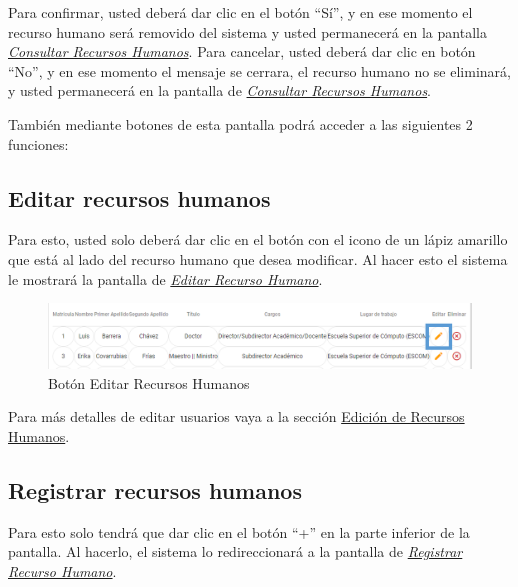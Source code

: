 \begin{enumerate}
\begin{figure}[!hbtp]
                \end{figure}
            
                Para confirmar, usted deberá dar clic en el botón “Sí”, y en ese momento el recurso humano será removido del sistema y usted permanecerá en la pantalla \hyperlink{consultarRH}{\textit{Consultar Recursos Humanos}}.
                Para cancelar, usted deberá dar clic en botón “No”, y en ese momento el mensaje se cerrara, el recurso humano no se eliminará, y usted permanecerá en la pantalla de \hyperlink{consultarRH}{\textit{Consultar Recursos Humanos}}.

                
        
        \end{enumerate}

        También mediante botones de esta pantalla podrá acceder a las siguientes 2 funciones:

        \subsection{Editar recursos humanos}

            Para esto, usted solo deberá dar clic en el botón con el icono de un lápiz amarillo que está al lado del recurso humano que desea modificar. Al hacer esto el sistema le mostrará la pantalla   de \hyperlink{editarRH}{\textit{Editar Recurso Humano}}.
            
            \begin{figure}[!hbtp]
                \centering
                \hypertarget{editar}{\includegraphics[width=0.7\linewidth]{images/SP1/BtnEditar}}
                \caption{Botón Editar Recursos Humanos}
                \label{editar}
            \end{figure}
            
            Para más detalles de editar usuarios vaya a la sección \hyperlink{editar-RH}{Edición de Recursos Humanos}.
        
        \subsection{Registrar recursos humanos}

            Para esto solo tendrá que dar clic en el botón “+” en la parte inferior de la pantalla. Al hacerlo, el sistema  lo redireccionará a la pantalla de \hyperlink{registrarRH}{\textit{Registrar Recurso Humano}}.
        
